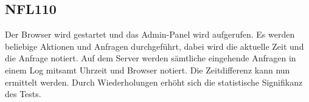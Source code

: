 \subsection*{NFL110}

Der Browser wird gestartet und das Admin-Panel wird aufgerufen.
Es werden beliebige Aktionen und Anfragen durchgeführt, dabei wird die aktuelle Zeit und die Anfrage notiert.
Auf dem Server werden sämtliche eingehende Anfragen in einem Log mitsamt Uhrzeit und Browser notiert.
Die Zeitdifferenz kann nun ermittelt werden.
Durch Wiederholungen erhöht sich die statistische Signifikanz des Tests.
